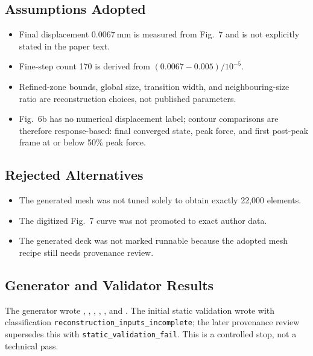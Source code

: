 \documentclass[11pt,a4paper]{article}
\begin{document}
\subsection*{Assumptions Adopted}

\begin{itemize}
  \item Final displacement \(0.0067\ \mathrm{mm}\) is measured from Fig.~7 and is not explicitly stated in the paper text.
  \item Fine-step count 170 is derived from \((0.0067-0.005)/10^{-5}\).
  \item Refined-zone bounds, global size, transition width, and neighbouring-size ratio are reconstruction choices, not published parameters.
  \item Fig.~6b has no numerical displacement label; contour comparisons are therefore response-based: final converged state, peak force, and first post-peak frame at or below 50\% peak force.
\end{itemize}

\subsection*{Rejected Alternatives}

\begin{itemize}
  \item The generated mesh was not tuned solely to obtain exactly 22,000 elements.
  \item The digitized Fig.~7 curve was not promoted to exact author data.
  \item The generated deck was not marked runnable because the adopted mesh recipe still needs provenance review.
\end{itemize}

\subsection*{Generator and Validator Results}

The generator wrote , , , , , and . The initial static validation wrote  with classification \texttt{reconstruction\_inputs\_incomplete}; the later provenance review supersedes this with \texttt{static\_validation\_fail}. This is a controlled stop, not a technical pass.
\end{document}
